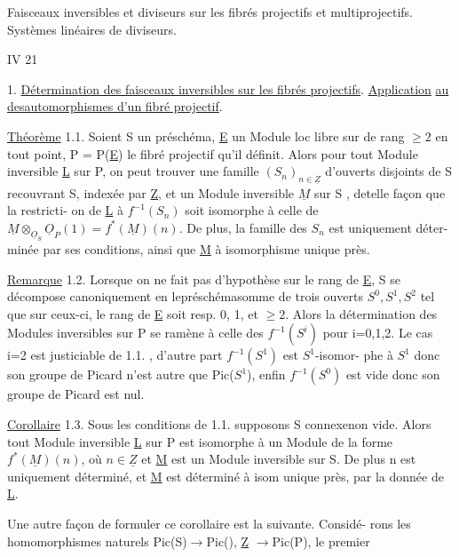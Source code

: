 Faisceaux inversibles et diviseurs sur les fibrés projectifs et multiprojectifs. Systèmes linéaires de diviseurs. 

IV 21 


1. \uline{Détermination des faisceaux inversibles sur les fibrés projectifs}.
\uline{Application} \uline{au  des}\hand{/}\uline{automorphismes d'un fibré projectif}.

\uline{Théorème} 1.1. Soient S un préschéma, \underline{E} un Module loc libre sur  de
rang  $\geqslant 2$ en tout point,
 P = P(\underline{E}) le fibré projectif qu'il définit. Alors
\placedmargin{*} pour tout Module inversible \underline{L} sur P, on peut trouver une famille
 $(S_n)_{n\in\underline{Z}}$ d'ouverts disjoints de S recouvrant S, indexée par \underline{Z}, et
 un Module inversible $\underline{M}$ sur S , detelle façon que
 la restricti-%
on de \underline{L} à $f^{-1}(S_n)$ soit isomorphe à celle de $\underline{M}\otimes_{\underline{O}_S}\underline{O}_P(1) = f^*(\underline{M})(n)$.
De plus, la  famille des $S_n$  est uniquement déter-%
minée par ses conditions, ainsi que \underline{M} à isomorphisme unique près.

\uline{Remarque} 1.2. Lorsque on ne fait pas d'hypothèse sur le rang de \underline{E}, S se
décompose canoniquement en lepréschémasomme de trois ouverts $S^0,S^1,S^2$ tel que sur
ceux-ci, le rang de \underline{E} soit resp. 0, 1, et $\geqslant 2$. Alors la détermination des
Modules inversibles sur P se ramène à celle des $f^{-1}(S^{i})$ pour i=0,1,2.
Le cas i=2 est justiciable de 1.1. , d'autre part $f^{-1}(S^1)$ est $S^1$-isomor-%
phe à $S^1$ donc son groupe de Picard n'est autre que Pic($S^1$), enfin
$f^{-1}(S^0)$ est vide donc son groupe de Picard est nul.

\uline{Corollaire} 1.3. Sous les conditions de 1.1. supposons S connexenon vide. Alors
tout Module inversible \underline{L} sur P est isomorphe à un Module de la forme
$f^*(\underline{M})(n)$, où $n\in\underline{Z}$ et \underline{M} est un Module inversible sur S. De plus n est
uniquement déterminé, et \underline{M} est déterminé à isom unique près, par la donnée
de \underline{L}.

Une autre façon de formuler ce corollaire est la suivante. Considé-%
rons les homomorphismes naturels Pic(S)$\longrightarrow$Pic(), \underline{Z} $\longrightarrow$Pic(P), le premier
